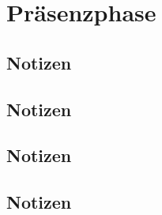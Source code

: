 \chapter{Präsenzphase}



\newpage
\section*{Notizen}
\newpage



\newpage
\section*{Notizen}
\newpage



\newpage
\section*{Notizen}
\newpage



\newpage
\section*{Notizen}
\newpage